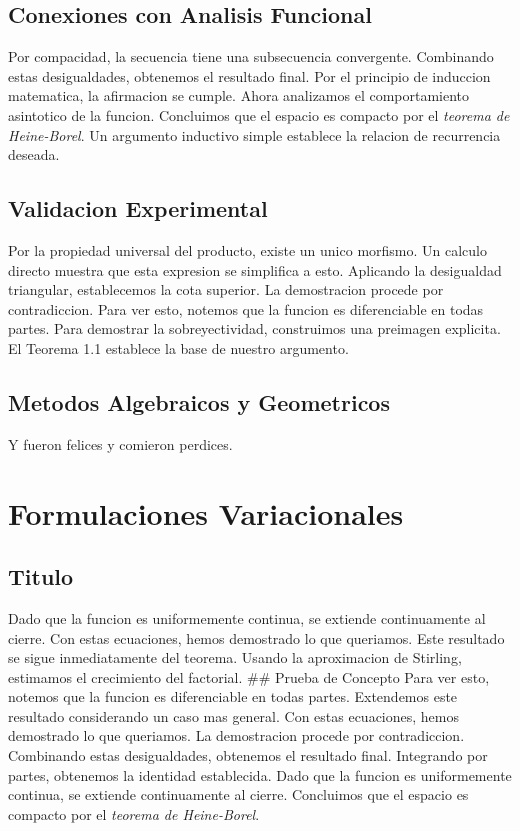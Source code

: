 \documentclass[
]{article}
\begin{document}
\subsection{Conexiones con Analisis
Funcional}\label{conexiones-con-analisis-funcional}

Por compacidad, la secuencia tiene una subsecuencia convergente.
Combinando estas desigualdades, obtenemos el resultado final. Por el
principio de induccion matematica, la afirmacion se cumple. Ahora
analizamos el comportamiento asintotico de la funcion. Concluimos que el
espacio es compacto por el \emph{teorema de Heine-Borel}. Un argumento
inductivo simple establece la relacion de recurrencia deseada.

\subsection{Validacion Experimental}\label{validacion-experimental}

Por la propiedad universal del producto, existe un unico morfismo. Un
calculo directo muestra que esta expresion se simplifica a esto.
Aplicando la desigualdad triangular, establecemos la cota superior. La
demostracion procede por contradiccion. Para ver esto, notemos que la
funcion es diferenciable en todas partes. Para demostrar la
sobreyectividad, construimos una preimagen explicita. El Teorema 1.1
establece la base de nuestro argumento.

\subsection{Metodos Algebraicos y
Geometricos}\label{metodos-algebraicos-y-geometricos}

Y fueron felices y comieron perdices.

\section{Formulaciones Variacionales}\label{formulaciones-variacionales}

\subsection{Titulo}\label{titulo}

Dado que la funcion es uniformemente continua, se extiende continuamente
al cierre. Con estas ecuaciones, hemos demostrado lo que queriamos. Este
resultado se sigue inmediatamente del teorema. Usando la aproximacion de
Stirling, estimamos el crecimiento del factorial. \#\# Prueba de
Concepto Para ver esto, notemos que la funcion es diferenciable en todas
partes. Extendemos este resultado considerando un caso mas general. Con
estas ecuaciones, hemos demostrado lo que queriamos. La demostracion
procede por contradiccion. Combinando estas desigualdades, obtenemos el
resultado final. Integrando por partes, obtenemos la identidad
establecida. Dado que la funcion es uniformemente continua, se extiende
continuamente al cierre. Concluimos que el espacio es compacto por el
\emph{teorema de Heine-Borel}.
\end{document}
